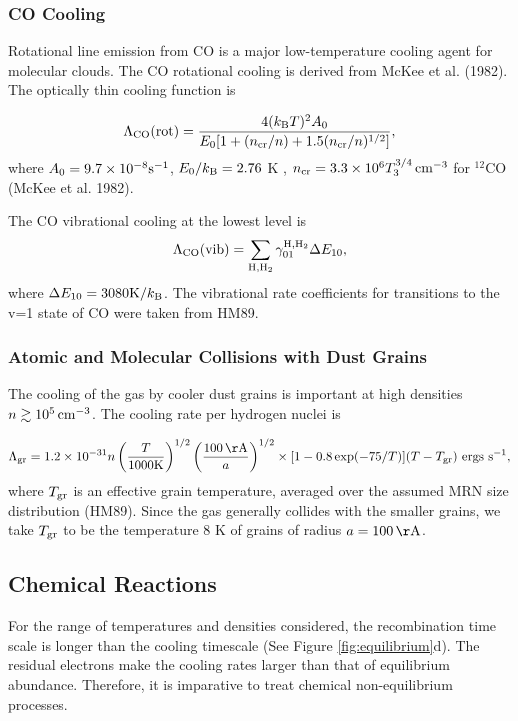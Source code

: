 \subsubsection{CO Cooling}
Rotational line emission from CO is a major
low-temperature cooling agent for molecular clouds.
The CO rotational cooling is derived from McKee et al. (1982).
The optically thin cooling function is

\begin{equation}
\Lambda_{\rm CO}({\rm rot})
=\frac{4(k_{\rm B}T)^2A_0}{E_0[1+(n_{\rm cr}/n)+1.5(n_{\rm cr}/n)^{1/2}]},
\end{equation}
where $A_0=9.7\times 10^{-8}{\rm s^{-1}}$, $E_0/k_{\rm B}=2.76$ K , 
$n_{\rm cr}=3.3\times 10^6 T_3^{3/4}\, {\rm cm^{-3}}$
for ${}^{12}$CO (McKee et al. 1982).

The CO vibrational cooling at the lowest level is
\begin{equation}
\Lambda_{\rm CO}({\rm vib})=
\sum_{\rm H,H_2}\gamma_{01}^{\rm H,H_2}\Delta E_{10},
\end{equation}
where $\Delta E_{10}=3080 {\rm K}/k_{\rm B}$.
The vibrational rate coefficients for transitions to
the v=1 state of CO were taken from HM89.

\subsubsection{Atomic and Molecular Collisions with Dust Grains}
The cooling of the gas by cooler dust grains is important at
high densities $n\gtrsim 10^5 \, {\rm cm^{-3}}$.
The cooling rate per hydrogen nuclei is

\begin{equation}
\Lambda_{\rm gr}=1.2\times 10^{-31}n
\left(\frac{T}{\rm 1000K}\right)^{1/2}
\left(\frac{100 \,{\rm \AA}}{a}\right)^{1/2}
\times[1-0.8\exp(-75/T)](T-T_{\rm gr}) \ {\rm ergs \ s^{-1}},
\end{equation}
where $T_{\rm gr}$ is an effective grain temperature, averaged over the
assumed MRN size distribution (HM89).
Since the gas generally collides with the smaller grains,
we take $T_{\rm gr}$ to be the temperature 8 K of grains of radius 
$a=100 \,{\rm \AA}$.

\subsection{Chemical Reactions}
For the range of temperatures and densities considered, the recombination time
scale is longer than the cooling timescale
(See Figure \ref{fig:equilibrium}d).
The residual electrons make the cooling rates larger than 
that of equilibrium abundance.
Therefore, it is imparative to treat chemical non-equilibrium processes.

